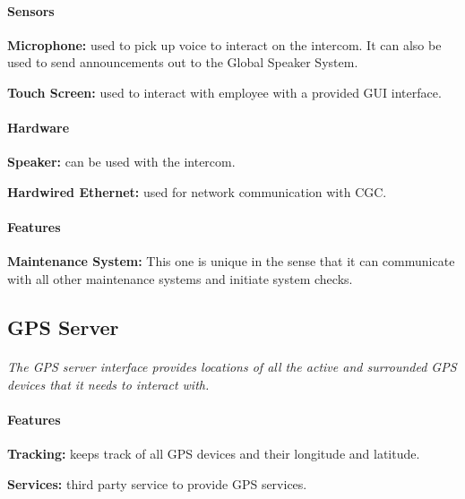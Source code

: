 \documentclass[12pt]{article}
\begin{document}
	\paragraph{Sensors}
	\begin{list}{}{}
		\item \textbf{Microphone: }used to pick up voice to interact on the intercom. 
		It can also be used to send announcements out to the Global Speaker System.
		\item \textbf{Touch Screen: }used to interact with employee with a provided 
		GUI interface.
	\end{list}
		
	\paragraph{Hardware}
	\begin{list}{}{}
		\item \textbf{Speaker: }can be used with the intercom.
		\item \textbf{Hardwired Ethernet: }used for network communication with CGC. 
	\end{list}
	
	\paragraph{Features}
	\begin{list}{}{}
		\item \textbf{Maintenance System: }This one is unique in the sense that it can
		communicate with all other maintenance systems and initiate system checks. 
	\end{list}

	\subsection{GPS Server}
	\paragraph{} \textit{The GPS server interface provides locations of all the active 
	and surrounded GPS devices that it needs to interact with. }		
	
	\paragraph{Features}
	\begin{list}{}{}
		\item \textbf{Tracking: }keeps track of all GPS devices and their longitude 
		and latitude.
        \item \textbf{Services: }third party service to provide GPS services. 
	\end{list}
\end{document}
